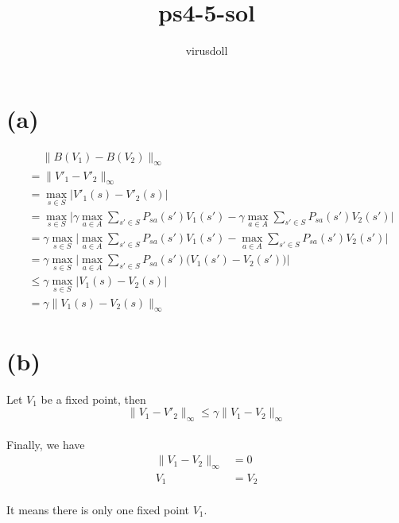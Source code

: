 \documentclass[11pt, a4paper]{article}
\title{ps4-5-sol}
\author{virusdoll}
\begin{document}
    \maketitle

    \section*{(a)}
    
    \begin{align*}
        & \quad \ \| B(V_1) - B(V_2) \| _\infty \\
        & = \| V'_1 - V'_2 \| _\infty \\
        & = \max_{s \in S} | V'_1(s) - V'_2(s) | \\
        & = \max_{s \in S} \Big|
            \gamma \max_{a \in A} \sum_{s' \in S} P_{sa}(s') V_1(s')
            - \gamma \max_{a \in A} \sum_{s' \in S} P_{sa}(s') V_2(s')
        \Big| \\
        & = \gamma \max_{s \in S} \Big|
            \max_{a \in A} \sum_{s' \in S} P_{sa}(s') V_1(s')
            - \max_{a \in A} \sum_{s' \in S} P_{sa}(s') V_2(s')
        \Big| \\
        & = \gamma \max_{s \in S} \Big|
            \max_{a \in A} \sum_{s' \in S} P_{sa}(s') \big( V_1(s') - V_2(s') \big)
        \Big| \\
        & \le \gamma \max_{s \in S} | V_1(s) - V_2(s) | \\
        & = \gamma \| V_1(s) - V_2(s) \|_\infty
    \end{align*}

    \section*{(b)}
    Let $V_1$ be a fixed point, then
    $$\| V_1 - V'_2 \|_\infty \le \gamma \| V_1 - V_2 \|_\infty$$
    \\
    Finally, we have
    \begin{align*}
        \| V_1 - V_2 \|_\infty & = 0 \\
        V_1 & = V_2
    \end{align*}
    \\
    It means there is only one fixed point $V_1$.
\end{document}
